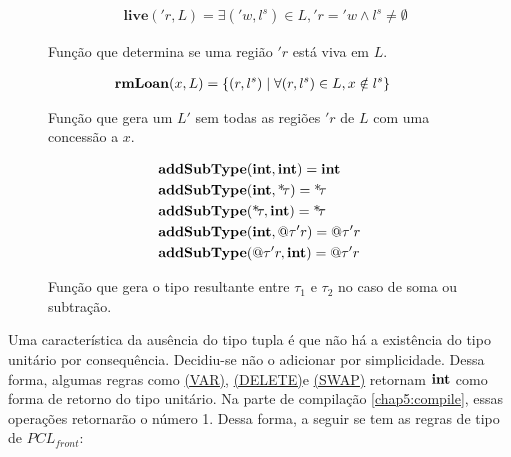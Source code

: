 \begin{figure}[ht]
	\caption{Função que determina se uma região $'r$ está viva em $L$.}
	\label{fig:def:live}
	\begin{align}
		&\mathbf{live}('r, L) = \exists ('w, l^s) \in L, {'r} = {'w} \land l^s \neq \emptyset
	\end{align}
\end{figure}

\begin{figure}[ht]
	\caption{Função que gera um $L'$ sem todas as regiões $'r$ de $L$ com uma concessão a $x$.}
	\label{fig:def:rmloan}
	\begin{align}
		&\mathbf{rmLoan}(x, L) = \{(r, l^s) \;|\; \forall (r, l^s) \in L, x \notin l^s \}
	\end{align}
\end{figure}

\begin{figure}[ht]
	\caption{Função que gera o tipo resultante entre $\tau_1$ e $\tau_2$ no caso de soma ou subtração.}
	\label{fig:def:addsub}
	\begin{align}
		&\mathbf{addSubType}(\mathbf{int}, \mathbf{int}) = \mathbf{int}\\ 
		&\mathbf{addSubType}(\mathbf{int}, \text{*}\!\tau) = \text{*}\!\tau\\ 
		&\mathbf{addSubType}(\text{*}\!\tau, \mathbf{int}) = \text{*}\!\tau\\ 
		&\mathbf{addSubType}(\mathbf{int}, @\tau'r) = @\tau'r\\ 
		&\mathbf{addSubType}(@\tau'r, \mathbf{int}) = @\tau'r
	\end{align}
\end{figure}

Uma característica da ausência do tipo tupla é que não há a existência do tipo unitário por consequência. Decidiu-se não o adicionar por simplicidade. Dessa forma, algumas regras como \hyperref[trule:var]{(VAR)}, \hyperref[trule:delete]{(DELETE)}e \hyperref[trule:swap]{(SWAP)} retornam $\mathbf{int}$ como forma de retorno do tipo unitário. Na parte de compilação \ref{chap5:compile}, essas operações retornarão o número 1. Dessa forma, a seguir se tem as regras de tipo de $PCL_{front}$:



